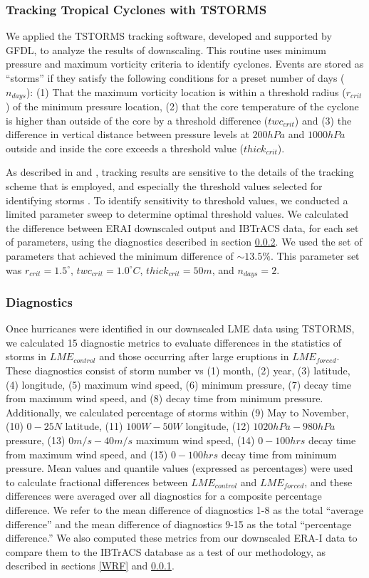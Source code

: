\documentclass[phd,tocprelim]{cornell}
\begin{document}
\subsubsection{Tracking Tropical Cyclones with TSTORMS}
\label{tstorms}
We applied the TSTORMS \cite{tc_algo} tracking software, developed and
supported by GFDL, to analyze the results of downscaling. This routine
uses minimum pressure and maximum vorticity criteria to identify
cyclones. Events are stored as ``storms'' if they satisfy the
following conditions for a preset number of days ($n_{days}$): (1)
That the maximum vorticity location is within a threshold radius
($r_{crit}$) of the minimum pressure location, (2) that the core
temperature of the cyclone is higher than outside of the core by a
threshold difference ($twc_{crit}$) and (3) the difference in vertical
distance between pressure levels at $200hPa$ and $1000hPa$ outside and
inside the core exceeds a threshold value ($thick_{crit}$).

As described in \cite{kerry_clivar} and \cite{tc_algo}, tracking
results are sensitive to the details of the tracking scheme that is
employed, and especially the threshold values selected for identifying
storms \cite{tc_track}. To identify sensitivity to threshold values,
we conducted a limited parameter sweep to determine optimal threshold
values. We calculated the difference between ERAI downscaled output
and IBTrACS data, for each set of parameters, using the diagnostics
described in section \ref{diags}. We used the set of parameters that
achieved the minimum difference of ${\sim}13.5\%$. This parameter set
was $r_{crit} = 1.5^{\circ}$, $twc_{crit} = 1.0^{\circ}C$,
$thick_{crit} = 50m$, and $n_{days} = 2$.

\subsubsection{Diagnostics}
\label{diags}
Once hurricanes were identified in our downscaled LME data using
TSTORMS, we calculated 15 diagnostic metrics to evaluate differences
in the statistics of storms in $LME_{control}$ and those occurring
after large eruptions in $LME_{forced}$.  These diagnostics consist of
storm number vs (1) month, (2) year, (3) latitude, (4) longitude, (5)
maximum wind speed, (6) minimum pressure, (7) decay time from maximum
wind speed, and (8) decay time from minimum pressure. Additionally, we
calculated percentage of storms within (9) May to November, (10)
$0-25N$ latitude, (11) $100W-50W$ longitude, (12) $1020hPa-980hPa$
pressure, (13) $0m/s-40m/s$ maximum wind speed, (14) $0-100hrs$ decay
time from maximum wind speed, and (15) $0-100hrs$ decay time from
minimum pressure. Mean values and quantile values (expressed as
percentages) were used to calculate fractional differences between
$LME_{control}$ and $LME_{forced}$, and these differences were
averaged over all diagnostics for a composite percentage
difference. We refer to the mean difference of diagnostics 1-8 as the
total ``average difference'' and the mean difference of diagnostics
9-15 as the total ``percentage difference.'' We also computed these
metrics from our downscaled ERA-I data to compare them to the IBTrACS
database as a test of our methodology, as described in sections
\ref{WRF} and \ref{tstorms}.
\end{document}
